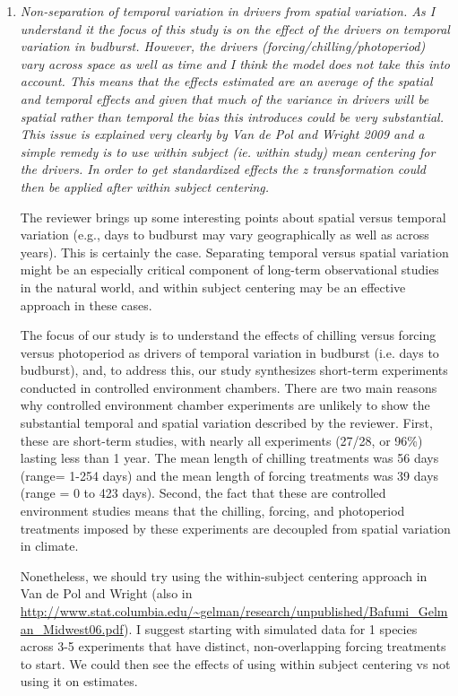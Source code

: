 \documentclass[11pt, a4paper]{article}
\begin{document}
\begin{enumerate}
\item \emph{Non-separation of temporal variation in drivers from spatial variation. As I understand it the
focus of this study is on the effect of the drivers on temporal variation in budburst. However,
the drivers (forcing/chilling/photoperiod) vary across space as well as time and I think the
model does not take this into account. This means that the effects estimated are an average of
the spatial and temporal effects and given that much of the variance in drivers will be spatial
rather than temporal the bias this introduces could be very substantial. This issue is explained
very clearly by Van de Pol and Wright 2009 and a simple remedy is to use within subject (ie.
within study) mean centering for the drivers. In order to get standardized effects the z
transformation could then be applied after within subject centering.}
\par The reviewer brings up some interesting points about spatial versus temporal variation (e.g., days to budburst may vary geographically as well as across years). This is certainly the case. Separating temporal versus spatial variation might be an especially critical component of long-term observational studies in the natural world, and within subject centering may be an effective approach in these cases.  
\par The focus of our study is to understand the effects of chilling versus forcing versus photoperiod as drivers of temporal variation in budburst (i.e. days to budburst), and, to address this, our study synthesizes short-term experiments conducted in controlled environment chambers. There are two main reasons why controlled environment chamber experiments are unlikely to show the substantial temporal and spatial variation described by the reviewer. First, these are short-term studies, with nearly all experiments (27/28, or 96\%) lasting less than 1 year. The mean length of chilling treatments was 56 days (range= 1-254 days) and the mean length of forcing treatments was 39 days (range = 0 to 423 days). Second, the fact that these are controlled environment studies means that the chilling, forcing, and photoperiod treatments imposed by these experiments are decoupled from spatial variation in climate. 

\par Nonetheless, we should try using the within-subject centering approach in Van de Pol and Wright (also in \url{http://www.stat.columbia.edu/~gelman/research/unpublished/Bafumi_Gelman_Midwest06.pdf}). I suggest starting with simulated data for 1 species across 3-5 experiments that have distinct, non-overlapping forcing treatments to start. We could then see the effects of using within subject centering vs not using it on estimates. 


\end{enumerate}
\end{document}
